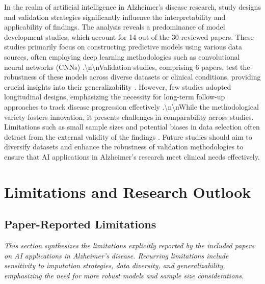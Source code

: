 \documentclass{MITcsail}
\begin{document}
In the realm of artificial intelligence in Alzheimer's disease research, study designs and validation strategies significantly influence the interpretability and applicability of findings. The analysis reveals a predominance of model development studies, which account for 14 out of the 30 reviewed papers. These studies primarily focus on constructing predictive models using various data sources, often employing deep learning methodologies such as convolutional neural networks (CNNs) \citep{ref_10_1016_j_neuroimage_2020_117203,ref_10_1016_j_irbm_2020_06_006}.\textbackslash{}n\textbackslash{}nValidation studies, comprising 6 papers, test the robustness of these models across diverse datasets or clinical conditions, providing crucial insights into their generalizability \citep{ref_10_1016_j_nicl_2021_102712,ref_10_1016_j_ejrad_2023_110934}. However, few studies adopted longitudinal designs, emphasizing the necessity for long-term follow-up approaches to track disease progression effectively \citep{ref_10_1016_j_measen_2022_100506}.\textbackslash{}n\textbackslash{}nWhile the methodological variety fosters innovation, it presents challenges in comparability across studies. Limitations such as small sample sizes and potential biases in data selection often detract from the external validity of the findings \citep{ref_10_3389_fpubh_2022_853294,ref_10_1002_alz_13390}. Future studies should aim to diversify datasets and enhance the robustness of validation methodologies to ensure that AI applications in Alzheimer’s research meet clinical needs effectively.

\section{Limitations and Research Outlook}

\subsection{Paper-Reported Limitations}

\textit{This section synthesizes the limitations explicitly reported by the included papers on AI applications in Alzheimer's disease. Recurring limitations include sensitivity to imputation strategies, data diversity, and generalizability, emphasizing the need for more robust models and sample size considerations.}
\end{document}
